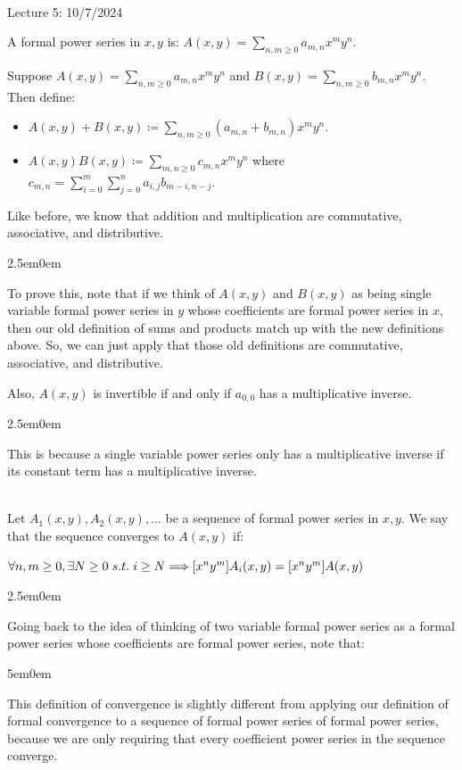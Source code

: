 \documentclass{book}
\newcommand{\hOne}{%
   \color{Black}%
   \fontsize{14}{16}\selectfont%
}
\newcommand{\myComment}{%
   \color{RawerSienna}%
   \fontsize{12}{14}\selectfont%
}
\newenvironment{myIndent}{%
   \begin{adjustwidth}{2.5em}{0em}%
}{%
   \end{adjustwidth}%
}
\newenvironment{myDindent}{%
   \begin{adjustwidth}{5em}{0em}%
}{%
   \end{adjustwidth}%
}
\newcommand{\suchthat}{ \hspace{0.3em}s.t.\hspace{0.3em}}
\newcommand{\mySepTwo}[1][.]{%
   {\noindent\color{#1}{\rule{6.5in}{0.5mm}}}\\%
}
\newcommand{\retTwo}{\hfill\bigbreak}
\newcommand{\mHeader}[1]{{
   \color{Black}%
   \fontsize{20}{18}\selectfont%
   #1\retTwo
}}
\begin{document}
\hOne\mySepTwo

\mHeader{Lecture 5: 10/7/2024}

A formal power series in $x, y$ is: $A(x, y) = \sum\limits_{n,m\geq 0} a_{m,n}x^m y^n$.

Suppose $A(x, y) = \sum\limits_{n,m\geq 0} a_{m,n}x^m y^n$ and $B(x, y) = \sum\limits_{n,m \geq 0}b_{m,n}x^my^n$. Then define:

\begin{itemize}
   \item $A(x, y) + B(x, y) \coloneq \sum\limits_{n,m\geq 0} (a_{m,n} + b_{m,n})x^m y^n$.\\ [-10pt]
   \item $A(x, y)B(x, y) \coloneq \sum\limits_{m,n \geq 0}c_{m,n}x^my^n$ where $c_{m,n} = \sum\limits_{i=0}^m \sum\limits_{j=0}^n a_{i,j}b_{m-i,n-j}$.
\end{itemize}

Like before, we know that addition and multiplication are commutative, associative, and distributive.
\begin{myIndent}\myComment
   To prove this, note that if we think of $A(x, y)$ and $B(x, y)$ as being single variable formal power series in $y$ whose coefficients are formal power series in $x$, then our old definition of sums and products match up with the new definitions above. So, we can just apply that those old definitions are commutative, associative, and distributive.\newpage
\end{myIndent}


Also, $A(x, y)$ is invertible if and only if $a_{0,0}$ has a multiplicative inverse.
\begin{myIndent}\myComment
   This is because a single variable power series only has a multiplicative inverse if its constant term has a multiplicative inverse.\retTwo
\end{myIndent}

\mySepTwo

Let $A_1(x, y), A_2(x, y), \ldots$ be a sequence of formal power series in $x, y$. We say that the sequence converges to $A(x, y)$ if:

{\centering $\forall n, m \geq 0, \exists N \geq 0 \suchthat i \geq  N \Longrightarrow [x^ny^m]A_i(x, y) = [x^ny^m]A(x, y)$\retTwo\par}


\begin{myIndent}\myComment
   Going back to the idea of thinking of two variable formal power series as a formal power series whose coefficients are formal power series, note that:\\
   \begin{myDindent}
      This definition of convergence is slightly different from applying our definition of formal convergence to a sequence of formal power series of formal power series, because we are only requiring that every coefficient power series in the sequence converge.
   \end{myDindent}
\end{myIndent}
\end{document}
